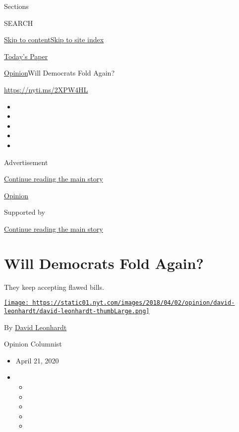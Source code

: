 Sections

SEARCH

\protect\hyperlink{site-content}{Skip to
content}\protect\hyperlink{site-index}{Skip to site index}

\href{https://myaccount.nytimes.com/auth/login?response_type=cookie\&client_id=vi}{}

\href{https://www.nytimes.com/section/todayspaper}{Today's Paper}

\href{/section/opinion}{Opinion}\textbar{}Will Democrats Fold Again?

\href{https://nyti.ms/2XPW4HL}{https://nyti.ms/2XPW4HL}

\begin{itemize}
\item
\item
\item
\item
\item
\end{itemize}

Advertisement

\protect\hyperlink{after-top}{Continue reading the main story}

\href{/section/opinion}{Opinion}

Supported by

\protect\hyperlink{after-sponsor}{Continue reading the main story}

\hypertarget{will-democrats-fold-again}{%
\section{Will Democrats Fold Again?}\label{will-democrats-fold-again}}

They keep accepting flawed bills.

\href{https://www.nytimes.com/by/david-leonhardt}{\texttt{[image: https://static01.nyt.com/images/2018/04/02/opinion/david-leonhardt/david-leonhardt-thumbLarge.png]}}

By \href{https://www.nytimes.com/by/david-leonhardt}{David Leonhardt}

Opinion Columnist

\begin{itemize}
\item
  April 21, 2020
\item
  \begin{itemize}
  \item
  \item
  \item
  \item
  \item
  \end{itemize}
\end{itemize}

